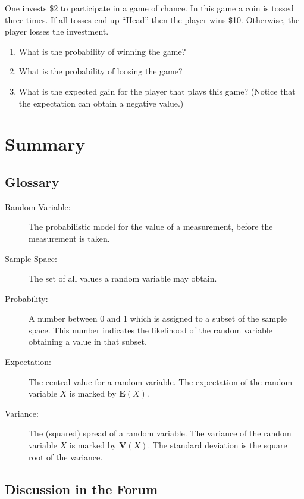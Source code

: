 \documentclass[
]{krantz}
\newcommand{\Expec}{\mathbf{E}}
\newcommand{\Var}{\mathbf{V}}
\theoremstyle{definition}
\theoremstyle{definition}
\theoremstyle{definition}
\theoremstyle{remark}
\let\BeginKnitrBlock\begin \let\EndKnitrBlock\end
\begin{document}
\BeginKnitrBlock{exercise}
\protect\hypertarget{exr:unnamed-chunk-54}{}{\label{exr:unnamed-chunk-54} }One invests \$2 to participate in a game of chance.
In this game a coin is tossed three times. If all tosses end up ``Head''
then the player wins \$10. Otherwise, the player losses the investment.

\begin{enumerate}
\def\labelenumi{\arabic{enumi}.}
\item
  What is the probability of winning the game?
\item
  What is the probability of loosing the game?
\item
  What is the expected gain for the player that plays this game?
  (Notice that the expectation can obtain a negative value.)
\end{enumerate}
\EndKnitrBlock{exercise}

\hypertarget{summary-3}{%
\section{Summary}\label{summary-3}}

\hypertarget{glossary}{%
\subsection*{Glossary}\label{glossary}}


\begin{description}
\item[Random Variable:]
The probabilistic model for the value of a measurement, before the
measurement is taken.
\item[Sample Space:]
The set of all values a random variable may obtain.
\item[Probability:]
A number between 0 and 1 which is assigned to a subset of the sample
space. This number indicates the likelihood of the random variable
obtaining a value in that subset.
\item[Expectation:]
The central value for a random variable. The expectation of the
random variable \(X\) is marked by \(\Expec(X)\).
\item[Variance:]
The (squared) spread of a random variable. The variance of the
random variable \(X\) is marked by \(\Var(X)\). The standard deviation
is the square root of the variance.
\end{description}

\hypertarget{discussion-in-the-forum}{%
\subsection*{Discussion in the Forum}\label{discussion-in-the-forum}}
\end{document}
